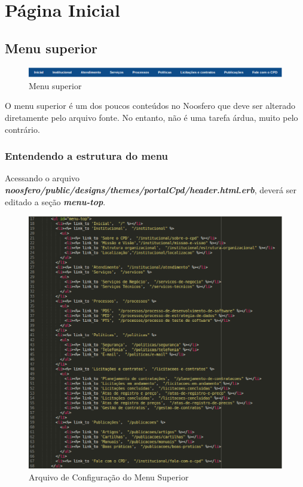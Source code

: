 \chapter{Página Inicial}
\label{chap:paginaInicial}


\section{Menu superior}
\label{menuSuperior}
\begin{figure}[h]
     \centering
       \includegraphics[keepaspectratio=true,scale=0.49]{figuras/menu_superior}
     \caption{Menu superior}
\end{figure}

O menu superior é um dos poucos conteúdos no Noosfero que deve ser alterado 
diretamente pelo arquivo fonte. No entanto, não é uma tarefa árdua, muito pelo
contrário.

\subsection{Entendendo a estrutura do menu}

Acessando o arquivo \emph{\textbf{noosfero/public/designs/themes/portalCpd/header.html.erb}},
deverá ser editado a seção \emph {\textbf{menu-top}}.

\begin{figure}[h]
     \centering
       \includegraphics[scale=0.5]{figuras/menu-top}
     \caption{Arquivo de Configuração do Menu Superior}
\end{figure}

